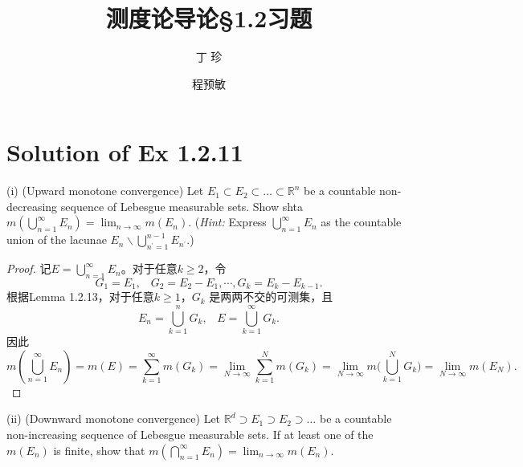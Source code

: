 \documentclass[reqno,a4paper,14pt]{amsart}
\title{\textbf{测度论导论\S1.2习题}}
\author{丁\;\;\; 珍}
\author{程预敏}
\begin{document}
\maketitle
\section{Solution of Ex 1.2.11}
(i) (Upward monotone convergence) Let $E_1\subset E_2\subset \dots \subset \mathbb{R}^n$ be a countable non-decreasing sequence of Lebesgue measurable sets. Show shta $m(\bigcup_{n=1}^\infty E_n)=\lim_{n\to\infty} m(E_n)$. (\textit{Hint:} Express $\bigcup_{n=1}^\infty E_n$ as the countable union of the lacunae $E_n\backslash \bigcup_{n^\prime=1}^{n-1} E_{n^\prime}$.)
\begin{proof}
    记$E=\bigcup_{n=1}^\infty E_n$。对于任意$k\geq 2$，令
    \begin{equation*}
        G_1=E_1,\;\;\; G_2=E_2-E_1, \cdots, G_k=E_k-E_{k-1}.
    \end{equation*}
    根据Lemma 1.2.13，对于任意$k\geq 1$，$G_k$ 是两两不交的可测集，且
    \begin{equation*}
        E_n=\bigcup_{k=1}^n G_k,\;\;\; E=\bigcup_{k=1}^\infty G_k.
    \end{equation*}
    因此
    \begin{equation*}
        m(\bigcup_{n=1}^\infty E_n)=m(E)=\sum_{k=1}^\infty m(G_k)=\lim_{N\to\infty} \sum_{k=1}^N m(G_k)=\lim_{N\to\infty}m\biggl(\bigcup_{k=1}^N G_k\biggr)=\lim_{N\to\infty}m(E_N).
    \end{equation*}
\end{proof}
(ii) (Downward monotone convergence) Let $\mathbb{R}^d \supset E_1 \supset E_2\supset \dots$ be a countable non-increasing sequence of Lebesgue measurable sets. If at least one of the $m(E_n)$ is finite, show that $m(\bigcap_{n=1}^\infty E_n)=\lim_{n\to \infty} m(E_n)$.
\end{document}
